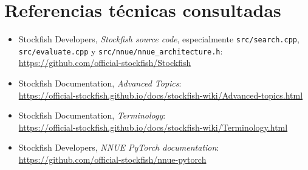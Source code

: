 \documentclass[11pt,a4paper]{article}
\begin{document}
\section*{Referencias técnicas consultadas}
\begin{itemize}
    \item Stockfish Developers, \emph{Stockfish source code}, especialmente \texttt{src/search.cpp}, \texttt{src/evaluate.cpp} y \texttt{src/nnue/nnue\_architecture.h}:\\
    \url{https://github.com/official-stockfish/Stockfish}
    \item Stockfish Documentation, \emph{Advanced Topics}:\\
    \url{https://official-stockfish.github.io/docs/stockfish-wiki/Advanced-topics.html}
    \item Stockfish Documentation, \emph{Terminology}:\\
    \url{https://official-stockfish.github.io/docs/stockfish-wiki/Terminology.html}
    \item Stockfish Developers, \emph{NNUE PyTorch documentation}:\\
    \url{https://github.com/official-stockfish/nnue-pytorch}
\end{itemize}
\end{document}
